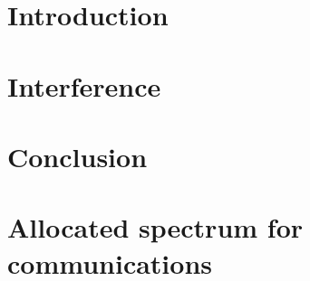 \documentclass[11pt, final]{ucthesis}
\begin{document}
\begin{dissertationText}
\renewcommand{\baselinestretch}{1.66}

\chapter{Introduction
    \label{chap:introduction}}    %

\chapter{Interference
    \label{chap:circles}}  %

\chapter{Conclusion
    \label{chap:conclusion}}
    


\clearpage


\ssp    %




\appendix
\chapter{Allocated spectrum for communications
    \label{appen:commspec}}
   
\end{dissertationText}
\end{document}
